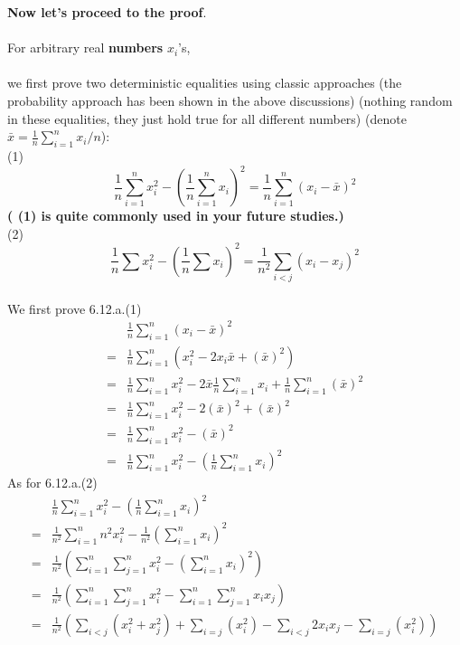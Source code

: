 \begin{exercise} [BH.6.12]
\begin{solution}
\begin{enumerate}
	\textbf{Now let's proceed to the proof}.\\~\\
	For arbitrary real \textbf{numbers} $x_i$'s, \\~\\
	{we first prove two deterministic equalities using classic approaches (the probability approach has been shown in the above discussions) (nothing random in these equalities, they just hold true for all different numbers)  (denote $\bar{x}=\frac{1}{n}\sum_{i=1}^n x_i/n$):\\
		{ (1)} $$\frac{1}{n}\sum_{i=1}^n  x_i^2  -  ( \frac{1}{n}\sum_{i=1}^n  x_i )^2  = \frac{1}{n}\sum_{i=1}^n \left(x_i -\bar{x} \right)^2$$
		\textbf{\scriptsize ({ (1)} is quite commonly used in your future studies.)} \\ 
		{ (2)} $$\frac{1}{n}\sum x_i^2 - \left(\frac{1}{n} \sum x_i\right)^2 =\frac{1}{n^2} \sum_{i < j} (x_i-x_j)^2 $$	
		~\\ We first prove 6.12.a.(1)	
		\begin{align*}
			& \frac{1}{n}\sum_{i=1}^n \left(x_i -\bar{x} \right)^2 \\
			=& \frac{1}{n}\sum_{i=1}^n \left(x_i^2  -2x_i\bar{x} +(\bar{x} )^2 \right)\\
			=& \frac{1}{n}\sum_{i=1}^n  x_i^2  -2\bar{x} \frac{1}{n}\sum_{i=1}^n x_i +\frac{1}{n}\sum_{i=1}^n (\bar{x} )^2  \\
			=& \frac{1}{n}\sum_{i=1}^n  x_i^2  -2(\bar{x})^2   +  (\bar{x} )^2   \\
			=& \frac{1}{n}\sum_{i=1}^n  x_i^2  -  (\bar{x} )^2\\
			=& \frac{1}{n}\sum_{i=1}^n  x_i^2  -  ( \frac{1}{n}\sum_{i=1}^n  x_i )^2  
		\end{align*}	
		As for 6.12.a.(2)
		\begin{align*}
			& 	\frac{1}{n}\sum_{i=1}^n x_i^2 - \left(\frac{1}{n} \sum_{i=1}^n x_i\right)^2 \\
			= & \frac{1}{n^2}\sum_{i=1}^n n^2 x_i^2 - \frac{1}{n^2} \left( \sum_{i=1}^n x_i\right)^2\\
			= & \frac{1}{n^2}\left(\sum_{i=1}^n\sum_{j=1}^n x_i^2 -   \left( \sum_{i=1}^n x_i\right)^2\right)\\
			= & \frac{1}{n^2}\left(\sum_{i=1}^n\sum_{j=1}^n x_i^2 -     \sum_{i=1}^n\sum_{j=1}^n x_i x_j \right) \\
			= & \frac{1}{n^2}\left(\sum_{i<j} \left(x_i^2 + x_j^2\right)+ \sum_{i=j} \left(x_i^2\right) -     \sum_{i<j}  2 x_i x_j-\sum_{i=j} \left(x_i^2\right) \right) \\

\end{align*}}
\end{enumerate}
\end{solution}
\end{exercise}
